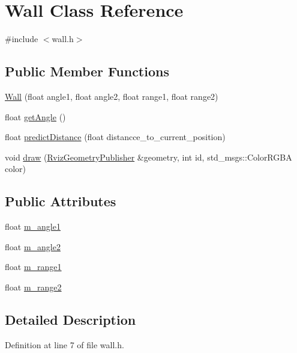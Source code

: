 \hypertarget{class_wall}{}\section{Wall Class Reference}
\label{class_wall}


{\ttfamily \#include $<$wall.\+h$>$}

\subsection*{Public Member Functions}
\begin{DoxyCompactItemize}
\item 
\hyperlink{class_wall_a033589df14e33d23252eea91b2cc998e}{Wall} (float angle1, float angle2, float range1, float range2)
\item 
float \hyperlink{class_wall_abf364c04876e2a2fe2afa609f87397ec}{get\+Angle} ()
\item 
float \hyperlink{class_wall_ad5b01236dea4aed8c75a8600c2b64c02}{predict\+Distance} (float distancce\+\_\+to\+\_\+current\+\_\+position)
\item 
void \hyperlink{class_wall_a18659ecc23d4b23617072afdd95c9d68}{draw} (\hyperlink{class_rviz_geometry_publisher}{Rviz\+Geometry\+Publisher} \&geometry, int id, std\+\_\+msgs\+::\+Color\+R\+G\+BA color)
\end{DoxyCompactItemize}
\subsection*{Public Attributes}
\begin{DoxyCompactItemize}
\item 
float \hyperlink{class_wall_aa55464f62abb57889a95936563a20671}{m\+\_\+angle1}
\item 
float \hyperlink{class_wall_a1acb9bc37500a68c08db14c3659c3cd0}{m\+\_\+angle2}
\item 
float \hyperlink{class_wall_a56b11c6748405e939de7cf4f9fabdc2d}{m\+\_\+range1}
\item 
float \hyperlink{class_wall_aeb7c600e6e41792c60498ca310c833f1}{m\+\_\+range2}
\end{DoxyCompactItemize}


\subsection{Detailed Description}


Definition at line 7 of file wall.\+h.




